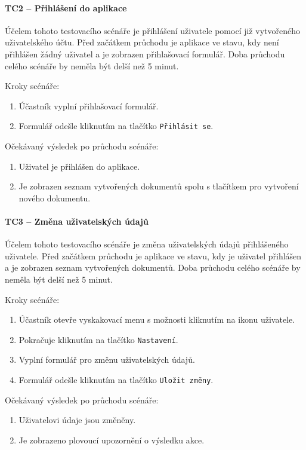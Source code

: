 \paragraph{TC2 -- Přihlášení do aplikace}

Účelem tohoto testovacího scénáře je přihlášení uživatele pomocí již vytvořeného uživatelského účtu.
Před začátkem průchodu je aplikace ve stavu, kdy není přihlášen žádný uživatel a je zobrazen přihlašovací formulář.
Doba průchodu celého scénáře by neměla být delší než 5 minut.

Kroky scénáře:
\begin{enumerate}
    \item Účastník vyplní přihlašovací formulář.
    \item Formulář odešle kliknutím na tlačítko \texttt{Přihlásit se}.
\end{enumerate}

Očekávaný výsledek po průchodu scénáře:
\begin{enumerate}
    \item Uživatel je přihlášen do aplikace.
    \item Je zobrazen seznam vytvořených dokumentů spolu s tlačítkem pro vytvoření nového dokumentu.
\end{enumerate}

\paragraph{TC3 -- Změna uživatelských údajů}

Účelem tohoto testovacího scénáře je změna uživatelských údajů přihlášeného uživatele.
Před začátkem průchodu je aplikace ve stavu, kdy je uživatel přihlášen a je zobrazen seznam vytvořených dokumentů.
Doba průchodu celého scénáře by neměla být delší než 5 minut.

Kroky scénáře:
\begin{enumerate}
    \item Účastník otevře vyskakovací menu s možnosti kliknutím na ikonu uživatele.
    \item Pokračuje kliknutím na tlačítko \texttt{Nastavení}.
    \item Vyplní formulář pro změnu uživatelských údajů.
    \item Formulář odešle kliknutím na tlačítko \texttt{Uložit změny}.
\end{enumerate}

Očekávaný výsledek po průchodu scénáře:
\begin{enumerate}
    \item Uživatelovi údaje jsou změněny.
    \item Je zobrazeno plovoucí upozornění o výsledku akce.
\end{enumerate}

